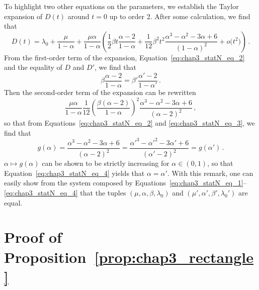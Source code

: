 \begin{subappendices}
To highlight two other equations on the parameters, we establish the Taylor expansion of $D(t)$ around $t = 0$ up to order 2.
After some calculation, we find that 
\begin{equation*}
  D(t) = \lambda_0 + \frac{\mu}{1-\alpha} + \frac{\mu\alpha}{1-\alpha} \left( \frac{1}{2} \beta t \frac{\alpha-2}{1-\alpha} + \frac{1}{12} \beta^2 t^2 \frac{\alpha^3 - \alpha^2 - 3\alpha + 6}{(1-\alpha)^2} + o\bigl(t^2\bigr) \right) \,.
\end{equation*}
From the first-order term of the expansion, Equation~\eqref{eq:chap3_statN_eq_2} and the equality of $D$ and $D'$, we find that
\begin{equation}\label{eq:chap3_statN_eq_3}
  \beta \frac{\alpha - 2}{1 - \alpha} = \beta' \frac{\alpha' - 2}{1 - \alpha'} \,.
\end{equation}
Then the second-order term of the expansion can be rewritten
\begin{equation*}
  \frac{\mu\alpha}{1-\alpha} \frac{1}{12} \left( \frac{\beta(\alpha-2)}{1-\alpha} \right)^2 \frac{\alpha^3 - \alpha^2 - 3\alpha + 6}{(\alpha-2)^2} \,,
\end{equation*}
so that from Equations~\eqref{eq:chap3_statN_eq_2} and \eqref{eq:chap3_statN_eq_3}, we find that 
\begin{equation}\label{eq:chap3_statN_eq_4}
  g(\alpha) = \frac{\alpha^3 - \alpha^2 - 3\alpha + 6}{(\alpha-2)^2} = \frac{\alpha'^3 - \alpha'^2 - 3\alpha' + 6}{(\alpha'-2)^2} = g(\alpha') \,.
\end{equation}
$\alpha \mapsto g(\alpha)$ can be shown to be strictly increasing for $\alpha \in (0, 1)$, so that Equation~\eqref{eq:chap3_statN_eq_4} yields that $\alpha = \alpha'$.
With this remark, one can easily show from the system composed by Equations~\eqref{eq:chap3_statN_eq_1}--\eqref{eq:chap3_statN_eq_4} that the tuples $(\mu, \alpha, \beta, \lambda_0)$ and $(\mu', \alpha', \beta', \lambda_0')$ are equal.


\section{Proof of Proposition~\ref{prop:chap3_rectangle}}
\label{app:felix3}


\end{subappendices}
